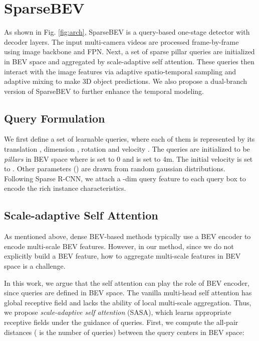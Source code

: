 \documentclass[10pt,twocolumn,letterpaper]{article}
\begin{document}
\section{SparseBEV}

As shown in Fig. \ref{fig:arch}, SparseBEV is a query-based one-stage detector with  decoder layers. The input multi-camera videos are processed frame-by-frame using image backbone and FPN. Next, a set of sparse pillar queries are initialized in BEV space and aggregated by scale-adaptive self attention. These queries then interact with the image features via adaptive spatio-temporal sampling and adaptive mixing to make 3D object predictions. We also propose a dual-branch version of SparseBEV to further enhance the temporal modeling.

\subsection{Query Formulation}

We first define a set of learnable queries, where each of them is represented by its translation , dimension , rotation  and velocity . The queries are initialized to be \textit{pillars} in BEV space where  is set to 0 and  is set to 4m. The initial velocity is set to . Other parameters () are drawn from random gaussian distributions. Following Sparse R-CNN\cite{sparsercnn}, we attach a -dim query feature to each query box to encode the rich instance characteristics.

\subsection{Scale-adaptive Self Attention}

As mentioned above, dense BEV-based methods typically use a BEV encoder to encode multi-scale BEV features. However, in our method, since we do not explicitly build a BEV feature, how to aggregate multi-scale features in BEV space is a challenge.

In this work, we argue that the self attention can play the role of BEV encoder, since queries are defined in BEV space. The vanilla multi-head self attention has global receptive field and lacks the ability of local multi-scale aggregation. Thus, we propose \textit{scale-adaptive self attention} (SASA), which learns appropriate receptive fields under the guidance of queries. First, we compute the all-pair distances  ( is the number of queries) between the query centers in BEV space:
\end{document}
